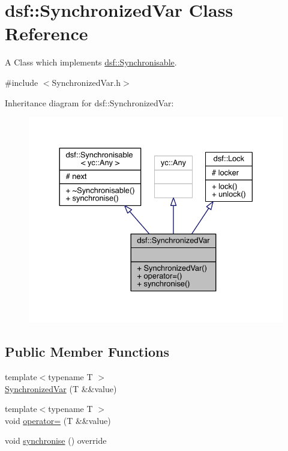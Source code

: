 \hypertarget{classdsf_1_1_synchronized_var}{}\section{dsf\+:\+:Synchronized\+Var Class Reference}
\label{classdsf_1_1_synchronized_var}


A Class which implements \hyperlink{classdsf_1_1_synchronisable}{dsf\+::\+Synchronisable}.  




{\ttfamily \#include $<$Synchronized\+Var.\+h$>$}



Inheritance diagram for dsf\+:\+:Synchronized\+Var\+:\nopagebreak
\begin{figure}[H]
\begin{center}
\leavevmode
\includegraphics[width=330pt]{classdsf_1_1_synchronized_var__inherit__graph}
\end{center}
\end{figure}
\subsection*{Public Member Functions}
\begin{DoxyCompactItemize}
\item 
{\footnotesize template$<$typename T $>$ }\\\hyperlink{classdsf_1_1_synchronized_var_aada6540bf8bbbf1451834f31aad0962f}{Synchronized\+Var} (T \&\&value)
\item 
{\footnotesize template$<$typename T $>$ }\\void \hyperlink{classdsf_1_1_synchronized_var_a8b72cc04251d677755090bd9b834291c}{operator=} (T \&\&value)
\item 
void \hyperlink{classdsf_1_1_synchronized_var_ac8465a885c4dbb5bc5ca9ad25f42c3ec}{synchronise} () override
\end{DoxyCompactItemize}
